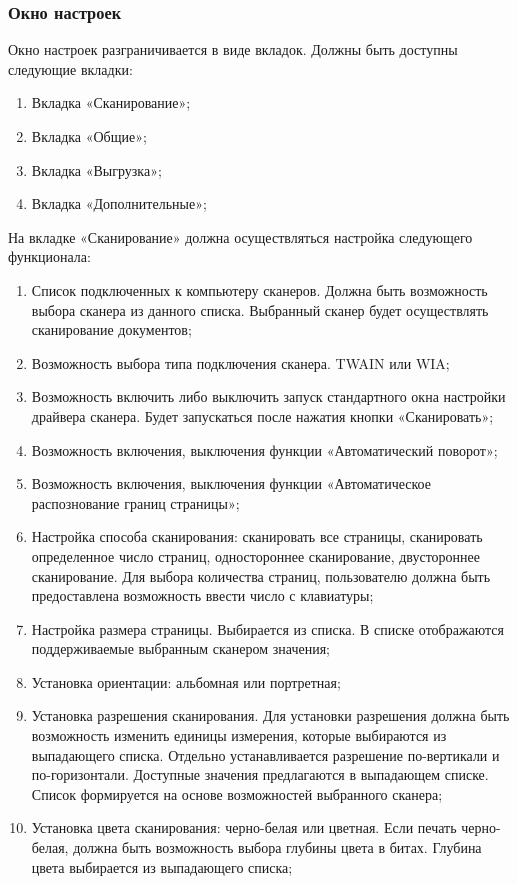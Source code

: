 \subsubsection{Окно настроек}
\label{sub:requirements:func_rec:settings_window}


Окно настроек разграничивается в виде вкладок. Должны быть доступны следующие вкладки:
\begin{enumerate}
	\item Вкладка «Сканирование»;
	\item Вкладка «Общие»;
	\item Вкладка «Выгрузка»;
	\item Вкладка «Дополнительные»;
\end{enumerate}

На вкладке «Сканирование» должна осуществляться настройка следующего функционала:
\begin{enumerate}
	\item Список подключенных к компьютеру сканеров. Должна быть возможность выбора сканера из данного списка. Выбранный сканер будет осуществлять сканирование документов;
	\item Возможность выбора типа подключения сканера. TWAIN или WIA;
	\item Возможность включить либо выключить запуск стандартного окна настройки драйвера сканера. Будет запускаться после нажатия кнопки «Сканировать»;
	\item Возможность включения, выключения функции «Автоматический поворот»;
	\item Возможность включения, выключения функции «Автоматическое распознование границ страницы»;
	\item Настройка способа сканирования: сканировать все страницы, сканировать определенное число страниц, одностороннее сканирование, двустороннее сканирование. Для выбора количества страниц, пользователю должна быть предоставлена возможность ввести число с клавиатуры;
	\item Настройка размера страницы. Выбирается из списка. В списке отображаются поддерживаемые выбранным сканером значения;
	\item Установка ориентации: альбомная или портретная;
	\item Установка разрешения сканирования. Для установки разрешения должна быть возможность изменить единицы измерения, которые выбираются из выпадающего списка. Отдельно устанавливается разрешение по-вертикали и по-горизонтали. Доступные значения предлагаются в выпадающем списке. Список формируется на основе возможностей выбранного сканера;
	\item Установка цвета сканирования: черно-белая или цветная. Если печать черно-белая, должна быть возможность выбора глубины цвета в битах. Глубина цвета выбирается из выпадающего списка;
\end{enumerate} 

